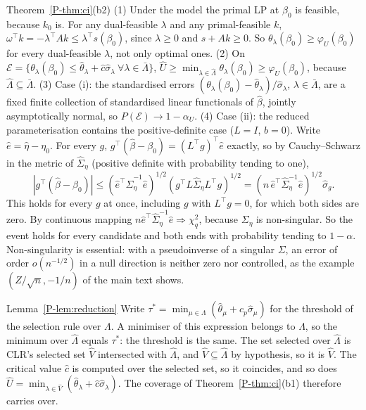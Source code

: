 \begin{proofof}{Theorem~\ref{P-thm:ci}(b2)}
(1) Under the model the primal LP at $\beta_0$ is feasible, because $k_0$ is. For any
dual-feasible $\lambda$ and any primal-feasible $k$,
$\omega^\top k=-\lambda^\top Ak\le\lambda^\top s(\beta_0)$, since $\lambda\ge0$ and
$s+Ak\ge0$. So $\theta_\lambda(\beta_0)\ge\varphi_U(\beta_0)$ for every dual-feasible
$\lambda$, not only optimal ones.
(2) On $\mathcal E=\{\theta_\lambda(\beta_0)\le\hat\theta_\lambda+\hat c\hat\sigma_\lambda\
\forall\lambda\in\bar\Lambda\}$,
$\hat U\ge\min_{\lambda\in\hat\Lambda}\theta_\lambda(\beta_0)\ge\varphi_U(\beta_0)$, because
$\hat\Lambda\subseteq\bar\Lambda$.
(3) Case (i): the standardised errors $(\theta_\lambda(\beta_0)-\hat\theta_\lambda)/\hat\sigma_\lambda$,
$\lambda\in\bar\Lambda$, are a fixed finite collection of standardised linear
functionals of $\hat\beta$, jointly asymptotically normal, so $P(\mathcal E)\to1-\alpha_U$.
(4) Case (ii): the reduced parameterisation contains the positive-definite case
($L=I$, $b=0$). Write $\hat e=\hat\eta-\eta_0$. For every $g$,
$g^\top(\hat\beta-\beta_0)=(L^\top g)^\top\hat e$ exactly, so by Cauchy--Schwarz in the
metric of $\hat\Sigma_\eta$ (positive definite with probability tending to one),
\[
|g^\top(\hat\beta-\beta_0)|\le(\hat e^\top\hat\Sigma_\eta^{-1}\hat e)^{1/2}(g^\top L\hat\Sigma_\eta L^\top g)^{1/2}
=(n\,\hat e^\top\hat\Sigma_\eta^{-1}\hat e)^{1/2}\hat\sigma_g .
\]
This holds for every $g$ at once, including $g$ with $L^\top g=0$, for which both sides
are zero. By continuous mapping $n\hat e^\top\hat\Sigma_\eta^{-1}\hat e\Rightarrow\chi^2_q$,
because $\Sigma_\eta$ is non-singular. So the event holds for every candidate and both
ends with probability tending to $1-\alpha$. Non-singularity is essential: with a
pseudoinverse of a singular $\Sigma$, an error of order $o(n^{-1/2})$ in a null direction
is neither zero nor controlled, as the example $(Z/\sqrt n,-1/n)$ of the main text shows.
\end{proofof}

\begin{proofof}{Lemma~\ref{P-lem:reduction}}
Write $\tau^*=\min_{\mu\in\Lambda}(\hat\theta_\mu+\hat c_p\hat\sigma_\mu)$ for the threshold
of the selection rule over $\Lambda$. A minimiser of this expression belongs to
$\hat\Lambda$, so the minimum over $\hat\Lambda$ equals $\tau^*$: the threshold is the same.
The set selected over $\hat\Lambda$ is CLR's selected set $\hat V$ intersected with
$\hat\Lambda$, and $\hat V\subseteq\hat\Lambda$ by hypothesis, so it is $\hat V$. The
critical value $\hat c$ is computed over the selected set, so it coincides, and so does
$\hat U=\min_{\lambda\in\hat V}(\hat\theta_\lambda+\hat c\hat\sigma_\lambda)$. The coverage of
Theorem~\ref{P-thm:ci}(b1) therefore carries over.
\end{proofof}

